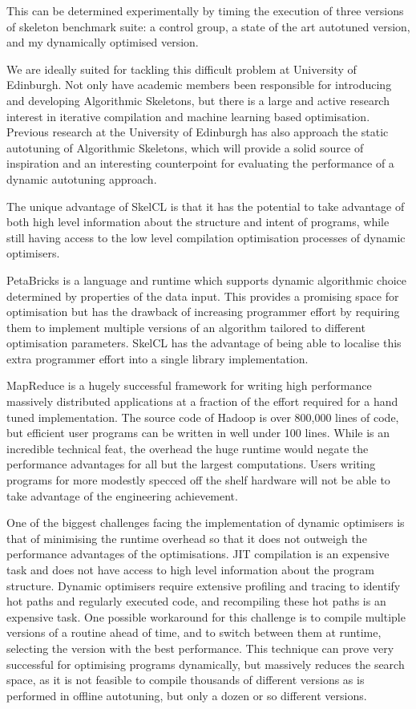 This can be determined experimentally by timing the execution of three
versions of skeleton benchmark suite: a control group, a state of the
art autotuned version, and my dynamically optimised version.


We are ideally suited for tackling this difficult problem at
University of Edinburgh. Not only have academic members been
responsible for introducing and developing Algorithmic Skeletons, but
there is a large and active research interest in iterative compilation
and machine learning based optimisation. Previous research at the
University of Edinburgh has also approach the static autotuning of
Algorithmic Skeletons, which will provide a solid source of
inspiration and an interesting counterpoint for evaluating the
performance of a dynamic autotuning approach.


The unique advantage of SkelCL is that it has the potential to take
advantage of both high level information about the structure and
intent of programs, while still having access to the low level
compilation optimisation processes of dynamic optimisers.

PetaBricks is a language and runtime which supports dynamic
algorithmic choice determined by properties of the data input. This
provides a promising space for optimisation but has the drawback of
increasing programmer effort by requiring them to implement multiple
versions of an algorithm tailored to different optimisation
parameters. SkelCL has the advantage of being able to localise this
extra programmer effort into a single library implementation.

MapReduce is a hugely successful framework for writing high
performance massively distributed applications at a fraction of the
effort required for a hand tuned implementation. The source code of
Hadoop is over 800,000 lines of code, but efficient user programs can
be written in well under 100 lines. While is an incredible technical
feat, the overhead the huge runtime would negate the performance
advantages for all but the largest computations. Users writing
programs for more modestly specced off the shelf hardware will not be
able to take advantage of the engineering achievement.

One of the biggest challenges facing the implementation of dynamic
optimisers is that of minimising the runtime overhead so that it does
not outweigh the performance advantages of the optimisations. JIT
compilation is an expensive task and does not have access to high
level information about the program structure. Dynamic optimisers
require extensive profiling and tracing to identify hot paths and
regularly executed code, and recompiling these hot paths is an
expensive task. One possible workaround for this challenge is to
compile multiple versions of a routine ahead of time, and to switch
between them at runtime, selecting the version with the best
performance. This technique can prove very successful for optimising
programs dynamically, but massively reduces the search space, as it is
not feasible to compile thousands of different versions as is
performed in offline autotuning, but only a dozen or so different
versions.

